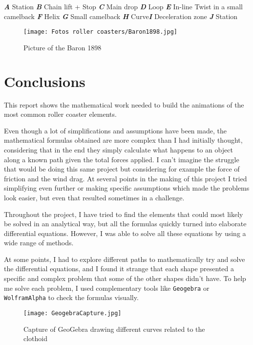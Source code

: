 \documentclass[12pt,twoside,a4paper]{article}
\begin{document}
	{\small\textbf{\textit{A}} Station	\textbf{\textit{B}} Chain lift + Stop \textbf{\textit{C}} Main drop \textbf{\textit{D}} Loop \textbf{\textit{E}} In-line Twist in a small camelback	\textbf{\textit{F}} Helix \textbf{\textit{G}} Small camelback	\textbf{\textit{H}} Curve\textbf{\textit{I}} Deceleration zone \textbf{\textit{J}} Station}

	\begin{figure}[H]
		\centering
		\texttt{[image: Fotos roller coasters/Baron1898.jpg]}
		\caption{Picture of the Baron 1898}
		\label{fig:Baron1898}
	\end{figure}

	\cleardoublepage
	
	\section{Conclusions}
	This report shows the mathematical work needed to build the animations of the most common roller coaster elements.
	
	Even though a lot of simplifications and assumptions have been made, the mathematical formulas obtained are more complex than I had initially thought, considering that in the end they simply calculate what happens to an object along a known path given the total forces applied. I can't imagine the struggle that would be doing this same project but considering for example the force of friction and the wind drag. At several points in the making of this project I tried simplifying even further or making specific assumptions which made the problems look easier, but even that resulted sometimes in a challenge.
	
	Throughout the project, I have tried to find the elements that could most likely be solved in an analytical way, but all the formulas quickly turned into elaborate differential equations. However, I was able to solve all these equations by using a wide range of methods.
	
	At some points, I had to explore different paths to mathematically try and solve the differential equations, and I found it strange that each shape presented a specific and complex problem that some of the other shapes didn't have. To help me solve each problem, I used complementary tools like \verb|Geogebra| or \verb|WolframAlpha| to check the formulas visually.
	
	\begin{figure}[H]
		\centering
		\texttt{[image: GeogebraCapture.jpg]}
		\caption{Capture of GeoGebra drawing different curves related to the clothoid}
		\label{fig:GeoGebra Editor Capture}
	\end{figure}
	
\end{document}
